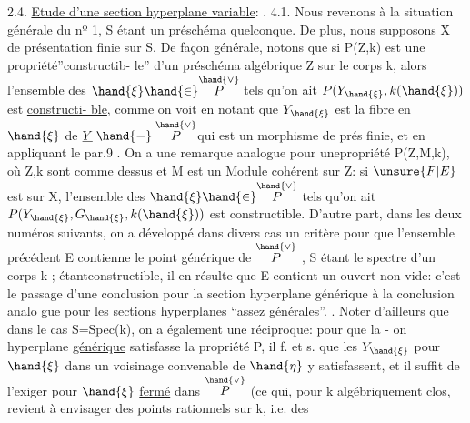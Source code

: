 2.4. \uline{Etude d'une section hyperplane variable}:  .
4.1.
Nous revenons à la situation générale du nº 1, S étant un préschéma
quelconque. De plus, nous supposons X de présentation finie sur S.
De façon générale, notons que si P(Z,k) est une propriété''constructib-%
le''  d'un préschéma algébrique Z sur le corps k,
alors l'ensemble des $\hand{\xi} \hand{\in} \overset{\hand{\vee}}{P}$ tels qu'on ait $P(Y_{\hand{\xi}},k(\hand{\xi}))$ est \uline{constructi-%
ble}, comme on voit en notant que $Y_{\hand{\xi}}$ est la fibre en $\hand{\xi}$ de $\underline{Y} \mathrel{\hand{-}} \overset{\hand{\vee}}{P}$\hand{,}qui
est un morphisme de prés finie, et en appliquant le par.9 . On a une
remarque analogue pour une\hand{|}propriété P(Z,M,k), où Z,k sont comme dessus
et M est un Module cohérent sur Z: si $\unsure{F|E}$ est  sur X, l'ensemble
des $\hand{\xi} \hand{\in} \overset{\hand{\vee}}{P}$ tels qu'on ait $P(Y_{\hand{\xi}},G_{\hand{\xi}},k(\hand{\xi}))$ est constructible. D'autre
part, dans les deux numéros suivants, on a développé  dans divers
cas un critère pour que l'ensemble précédent E contienne le point
générique de $\overset{\hand{\vee}}{P}$ , S étant le spectre d'un corps k ; étantconstructible,
il en résulte que E contient un ouvert non vide: c'est le passage d'une
conclusion pour la section hyperplane générique à la conclusion analo
gue pour les sections hyperplanes ``assez générales''.  \hand{[}\hand{]}. Noter d'ailleurs que 
dans le cas S=Spec(k), on a également une réciproque: pour que la -%
on hyperplane \uline{générique} satisfasse la propriété P, il f. et s. que
les $Y_{\hand{\xi}}$ pour $\hand{\xi}$ dans un voisinage convenable de $\hand{\eta}$ y satisfassent, et il
suffit de l'exiger pour $\hand{\xi}$ \uline{fermé} dans $\overset{\hand{\vee}}{P}$ (ce qui, pour k algébriquement
clos, revient à envisager des points rationnels sur k, i.e. des


